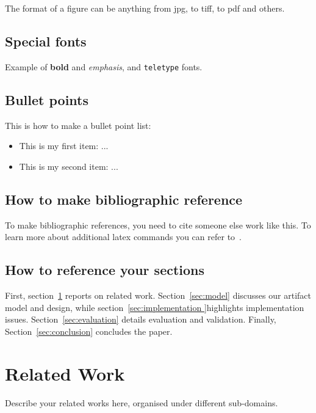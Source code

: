 \documentclass[10pt, conference, compsocconf]{IEEEtran}
\begin{document}
The format of a figure can be anything from jpg, to tiff, to pdf and others.


\subsection{Special fonts}
Example of \textbf{bold}  and \textit{emphasis}, and \texttt{teletype} fonts.



\subsection{Bullet points}

This is how to make a bullet point list:

\begin{itemize}

\item This is my first item: ...
\item This is my second item: ...

\end{itemize}

\subsection{How to make bibliographic reference}

To make bibliographic references, you need to cite someone else work like this.
To learn more about additional latex commands you can refer to~\cite{mittelbach2010latex}.


\subsection{How to reference your sections}

First, section~\ref{sec:relatedworks} reports on related work. Section~\ref{sec:model} discusses our artifact model and design, while section~\ref{sec:implementation }highlights implementation issues.
Section~\ref{sec:evaluation}  details evaluation and validation. Finally, Section~\ref{sec:conclusion}  concludes the paper.


\section{Related Work}\label{sec:relatedworks}
Describe your related works here, organised under different sub-domains.
\end{document}
